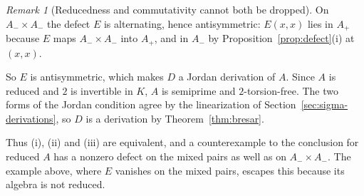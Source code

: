 \documentclass[]{interact}
\theoremstyle{plain}
\theoremstyle{definition}
\theoremstyle{remark}
\newtheorem{remark}[theorem]{Remark}
\begin{document}
\begin{remark}[Reducedness and commutativity cannot both be dropped]
On $A_- \times A_-$ the defect $E$ is alternating, hence antisymmetric: $E(x,x)$ lies in $A_+$ because $E$ maps $A_- \times A_-$ into $A_+$, and in $A_-$ by Proposition~\ref{prop:defect}(i) at $(x,x)$.

So $E$ is antisymmetric, which makes $D$ a Jordan derivation of $A$.
Since $A$ is reduced and $2$ is invertible in $K$, $A$ is semiprime and $2$-torsion-free.
The two forms of the Jordan condition agree by the linearization of Section~\ref{sec:sigma-derivations}, so $D$ is a derivation by Theorem~\ref{thm:bresar}.

Thus (i), (ii) and (iii) are equivalent, and a counterexample to the conclusion for reduced $A$ has a nonzero defect on the mixed pairs as well as on $A_- \times A_-$. The example above, where $E$ vanishes on the mixed pairs, escapes this because its algebra is not reduced.
\end{remark}
\end{document}
